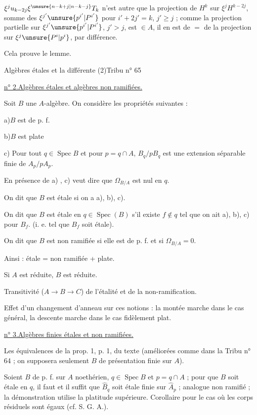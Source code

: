

$\xi^j u_{k-2j}\xi^{\unsure{n-k+j|n-k-j}}T_k$ n'est autre que la projection de $H^k$ sur $\xi^jH^{k-2j}$, somme des $\xi^{j'}\unsure{p^{i'}|P^{i'}}$ pour $i'+2j'=k$, $j'\geq j$ ;  comme la projection  partielle sur $\xi^{j'}\unsure{p^{i'}|P^{i'}}$, $j'>j$, est $\in A$, il en est de $=$ de la projection sur $\xi^j\unsure{P^i|p^i}$, par différence.

Cela prouve le lemme.



Algèbres étales et la différente (2)\hfill Tribu n° 65

\uline{n° 2.}\quad \uline{Algèbres étales et algèbres non ramifiées.}

Soit $B$ une $A$-algèbre. On considère les propriétés suivantes :

a)\quad $B$ est de p. f.

b)\quad $B$ est plate

c) Pour tout $q\in\operatorname{Spec}B$ et pour $p=q\cap A$, $B_q/pB_q$ est une extension séparable finie de $A_p/pA_p$.

En présence de a) , c) veut dire que $\Omega_{B/A}$ est nul en $q$.

On dit que $B$ est étale si on a a), b), c).

On dit que $B$ est étale en $q\in\operatorname{Spec}(B)$ s'il existe $f\notin q$ tel que on ait a), b), c) pour $B_f$. (i. e. tel que $B_f$ soit étale).

On dit que $B$ est non ramifiée si elle est de p. f. et si $\Omega_{B/A}=0$.

Ainsi : étale = non ramifiée + plate.

Si $A$ est réduite, $B$ est réduite.

Transitivité ($A\longrightarrow B\longrightarrow C$) de l'étalité et de la non-ramification.

Effet d'un changement d'anneau sur ces notions : la montée marche dans le cas général, la descente marche dans le cas fidèlement plat.

\uline{n° 3.}\quad \uline{Algèbres finies étales et non ramifiées.}

Les équivalences de la prop. 1, p. 1, du texte (améliorées comme dans la Tribu n° 64 ; on supposera seulement $B$ de présentation finie sur $A$).

Soient $B$ de p. f. sur $A$ noethérien, $q\in\operatorname{Spec}B$ et $p=q\cap A$ ; pour que $B$ soit étale en $q$, il faut et il suffit que $\hat{B}_q$ soit étale finie sur $\hat{A}_p$ ; analogue non ramifié ; la démonstration utilise la platitude supérieure. Corollaire pour le cas où les corps résiduels sont égaux (cf. S. G. A.).

